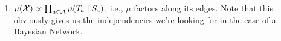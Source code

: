 \documentclass{article}
\newcommand{\X}{\mathcal X}
\begin{document}
\begin{defn}
\begin{enumerate}[label=\textbullet~\textit{q\arabic*-compatible} with $\Ar$ iff, labelwidth=-10em]
        \item %
        $
            \mu(\X) \propto \smash{\prod_{a \in \Ar}}\, \mu( \Tgt a \mid \Src a)$,
            i.e., $\mu$ factors along its edges.
        Note that this obviously gives us the independencies we're looking for in the case of a Bayesian Network.
%
    \qedhere
    \end{enumerate}
\end{defn}
\end{document}
